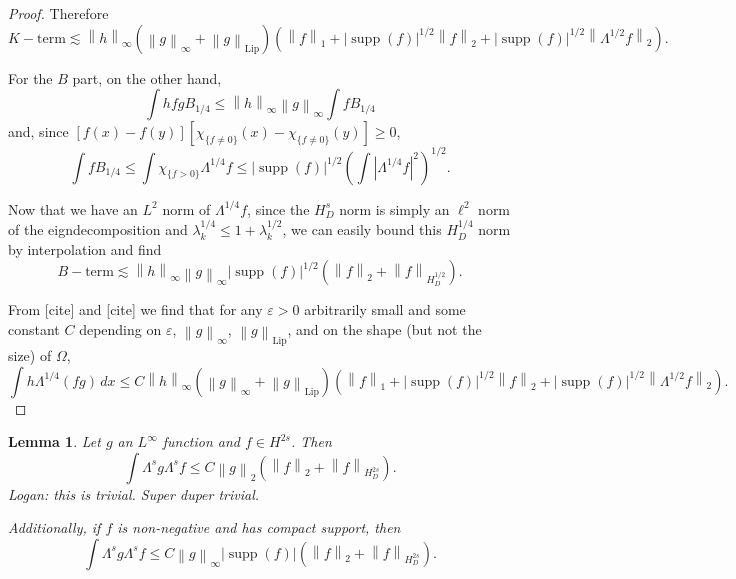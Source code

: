 \documentclass[11pt]{amsart}
\newtheorem{lemma}[theorem]{Lemma}
\theoremstyle{remark}
\theoremstyle{definition}
\newcommand{\eps}{\varepsilon}
\newcommand{\norm}[1]{\left\lVert#1\right\rVert}
\newcommand{\paren}[1]{\left( #1 \right)}
\newcommand{\abs}[1]{\left\lvert #1 \right\rvert}
\DeclareMathOperator{\supp}{supp}
\newcommand{\Lip}{\text{Lip}}
\newcommand{\indic}[1]{\chi_{\{#1\}}}
\begin{document}
\begin{proof}
Therefore 
\[ K-\textrm{term} \lesssim \norm{h}_\infty \paren{\norm{g}_\infty+\norm{g}_\Lip} \paren{ \norm{f}_1 + |\supp(f)|^{1/2} \norm{f}_2 + |\supp(f)|^{1/2} \norm{\Lambda^{1/2}f}_2}. \]

For the $B$ part, on the other hand, 
\[ \int h f g B_{1/4} \leq \norm{h}_\infty \norm{g}_\infty \int f B_{1/4} \]
and, since $[f(x)-f(y)][\indic{f\neq0}(x)-\indic{f\neq0}(y)] \geq 0$,
\[ \int f B_{1/4} \leq \int \indic{f>0} \Lambda^{1/4} f \leq |\supp(f)|^{1/2} \paren{\int \abs{\Lambda^{1/4} f}^2}^{1/2}. \]

Now that we have an $L^2$ norm of $\Lambda^{1/4} f$, since the $H^s_D$ norm is simply an $\ell^2$ norm of the eigndecomposition and $\lambda_k^{1/4} \leq 1 + \lambda_k^{1/2}$, we can easily bound this $H^{1/4}_D$ norm by interpolation and find
\[ B-\textrm{term} \lesssim \norm{h}_\infty \norm{g}_\infty |\supp(f)|^{1/2} \paren{\norm{f}_2 + \norm{f}_{H_D^{1/2}}}. \]

From [cite] and [cite] we find that for any $\eps > 0$ arbitrarily small and some constant $C$ depending on $\eps$, $\norm{g}_\infty$, $\norm{g}_\Lip$, and on the shape (but not the size) of $\Omega$,
\[ \int h \Lambda^{1/4} (fg) \,dx \leq C \norm{h}_\infty \paren{\norm{g}_\infty+\norm{g}_\Lip} \paren{ \norm{f}_1 + |\supp(f)|^{1/2} \norm{f}_2 + |\supp(f)|^{1/2} \norm{\Lambda^{1/2}f}_2}. \]
\end{proof}

\begin{lemma}
Let $g$ an $L^\infty$ function and $f \in H^{2s}$.  Then
\[ \int \Lambda^s g \Lambda^s f \leq C \norm{g}_2 \paren{ \norm{f}_2 + \norm{f}_{H_D^{2s}}}. \]
Logan: this is trivial.  Super duper trivial.  

Additionally, if $f$ is non-negative and has compact support, then 
\[ \int \Lambda^s g \Lambda^s f \leq C \norm{g}_\infty |\supp(f)| \paren{ \norm{f}_2 + \norm{f}_{H_D^{2s}}}. \]
\end{lemma}
\end{document}
